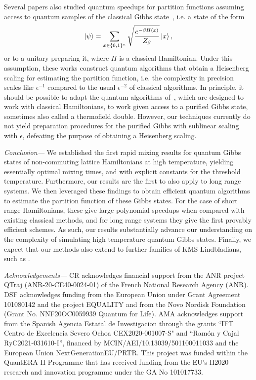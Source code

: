 \documentclass[aps,pra,amsmath,amssymb,twocolumn,10pt]{revtex4-2}
\theoremstyle{definition}
\begin{document}
Several papers also studied quantum speedups for partition functions assuming access to quantum samples of the classical Gibbs state~\cite{Montanaro2015,hamoudi_magniez,Arunachalam2022,Cornelissen2023}, i.e. a state of the form 
\begin{align}
\ket{\psi}=\sum\limits_{x\in\{0,1\}^n}\sqrt{\frac{e^{-\beta H(x)}}{Z_\beta}}\ket{x},
\end{align}
or to a unitary preparing it, where $H$ is a classical Hamiltonian. Under this assumption, these works construct quantum algorithms that obtain a Heisenberg scaling for estimating the partition function, i.e. the complexity in precision scales like $\epsilon^{-1}$ compared to the usual $\epsilon^{-2}$ of classical algorithms.
In principle, it should be possible to adapt the quantum algorithms of~\cite{Arunachalam2022}, which are designed to work with classical Hamiltonians, to work given access to a purified Gibbs state, sometimes also called a thermofield double. However, our techniques currently do not yield preparation procedures for the purified Gibbs with sublinear scaling with $\epsilon$, defeating the purpose of obtaining a Heisenberg scaling. 

\emph{Conclusion—}
We established the first rapid mixing results for quantum Gibbs states of non-commuting lattice Hamiltonians at high temperature, yielding essentially optimal mixing times, and with explicit constants for the threshold temperature. Furthermore, our results are the first to also apply to long range systems. We then leveraged these findings to obtain efficient quantum algorithms to estimate the partition function of these Gibbs states. For the case of short range Hamiltonians, these give large polynomial speedups when compared with existing classical methods, and for long range systems they give the first provably efficient schemes. As such, our results substantially advance our understanding on the complexity of simulating high temperature quantum Gibbs states. Finally, we expect that our methods also extend to further families of KMS Lindbladians, such as \cite{ding2024efficientquantumgibbssamplers,scandi2025thermalizationopenmanybodysystems,ding2025endtoendefficientquantumthermal}.

\emph{Acknowledgements—} 
CR acknowledges financial support from the ANR project QTraj (ANR-20-CE40-0024-01) of the French National Research Agency (ANR). DSF acknowledges funding from the European Union under Grant Agreement 101080142 and the project EQUALITY and from the Novo Nordisk
Foundation (Grant No. NNF20OC0059939 Quantum for Life). AMA acknowledges support from the Spanish Agencia Estatal de Investigacion through the grants ``IFT Centro de Excelencia Severo Ochoa CEX2020-001007-S" and ``Ram\'on y Cajal RyC2021-031610-I'', financed by MCIN/AEI/10.13039/501100011033 and the European Union NextGenerationEU/PRTR. This
project was funded within the QuantERA II Programme that has received funding from the EU’s H2020 research and innovation programme under the GA No 101017733.
\end{document}
